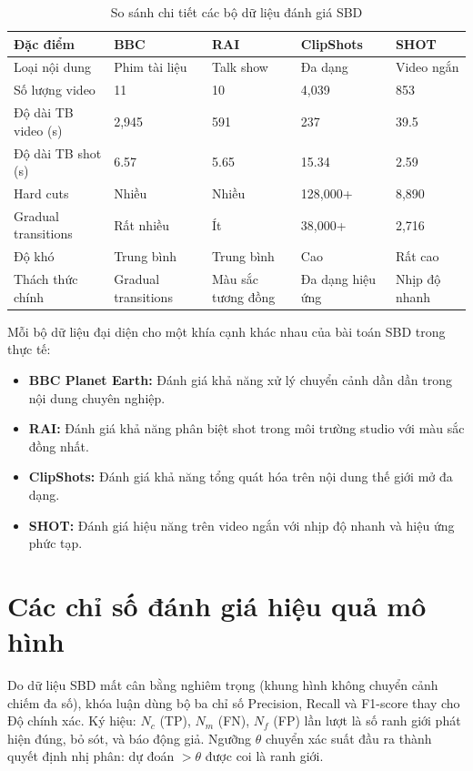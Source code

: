 \begin{table}[H]
\centering
\small
\begin{tabularx}{\textwidth}{l Y Y Y Y}
\toprule
\textbf{Đặc điểm} & \textbf{BBC} & \textbf{RAI} & \textbf{ClipShots} & \textbf{SHOT} \\
\midrule
Loại nội dung & Phim tài liệu & Talk show & Đa dạng & Video ngắn \\
Số lượng video & 11 & 10 & 4{,}039 & 853 \\
Độ dài TB video (s) & 2{,}945 & 591 & 237 & 39.5 \\
Độ dài TB shot (s) & 6.57 & 5.65 & 15.34 & 2.59 \\
Hard cuts & Nhiều & Nhiều & 128{,}000+ & 8{,}890 \\
Gradual transitions & Rất nhiều & Ít & 38{,}000+ & 2{,}716 \\
Độ khó & Trung bình & Trung bình & Cao & Rất cao \\
Thách thức chính & Gradual transitions & Màu sắc tương đồng & Đa dạng hiệu ứng & Nhịp độ nhanh \\
\bottomrule
\end{tabularx}
\caption{So sánh chi tiết các bộ dữ liệu đánh giá SBD}
\label{tab:dataset_comparison_detail}
\end{table}

Mỗi bộ dữ liệu đại diện cho một khía cạnh khác nhau của bài toán SBD trong thực tế:
\begin{itemize}
    \item \textbf{BBC Planet Earth:} Đánh giá khả năng xử lý chuyển cảnh dần dần trong nội dung chuyên nghiệp.
    \item \textbf{RAI:} Đánh giá khả năng phân biệt shot trong môi trường studio với màu sắc đồng nhất.
    \item \textbf{ClipShots:} Đánh giá khả năng tổng quát hóa trên nội dung thế giới mở đa dạng.
    \item \textbf{SHOT:} Đánh giá hiệu năng trên video ngắn với nhịp độ nhanh và hiệu ứng phức tạp.
\end{itemize}

\section{Các chỉ số đánh giá hiệu quả mô hình}
\label{sec:metrics}

Do dữ liệu SBD mất cân bằng nghiêm trọng (khung hình không chuyển cảnh chiếm đa số), khóa luận dùng bộ ba chỉ số Precision, Recall và F1-score thay cho Độ chính xác. Ký hiệu: $N_c$ (TP), $N_m$ (FN), $N_f$ (FP) lần lượt là số ranh giới phát hiện đúng, bỏ sót, và báo động giả. Ngưỡng $\theta$ chuyển xác suất đầu ra thành quyết định nhị phân: dự đoán $> \theta$ được coi là ranh giới.

